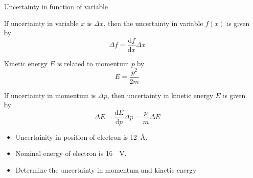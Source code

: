 %
\begin{frame}{Uncertainty in function of variable}
	\begin{itemize}
{\small
			\item If uncertainty in variable \(x\) is \(\Delta x\), then the uncertainty in variable \(f(x)\) is given by
		\[
		\Delta f = \frac{\mathrm{d}f}{\mathrm{d}x} \Delta x
		\]
		\item Kinetic energy \(E\) is related to momentum \(p\) by
		\[
		E = \frac{p^2}{2m}
		\]
		\item If uncertainty in momentum  is \(\Delta p\), then uncertainty in kinetic energy \(E\) is given by
		\[
		\Delta E = \frac{\mathrm{d}E}{\mathrm{d}p} \Delta p = \frac{p}{m} \Delta E
		\]
		}
	\end{itemize}
	\begin{problem}
		\begin{itemize}
			\item Uncertainity in position of electron is \SI{12}{\angstrom}.
			\item Nominal energy of electron is \SI{16}{\electron\volt}.
			\item Determine the uncertainty in momentum and kinetic energy
		\end{itemize}
	\end{problem}
\end{frame}